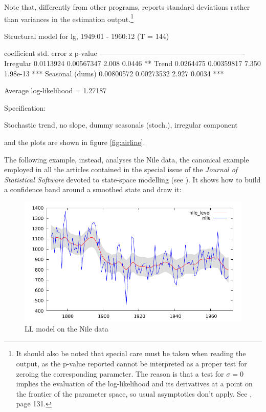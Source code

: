 \documentclass[a4paper,10pt]{article}
\begin{document}
Note that, differently from other programs,  reports
standard deviations rather than variances in the estimation
output.\footnote{It should also be noted that special care must be
  taken when reading the output, as the p-value reported cannot be
  interpreted as a proper test for zeroing the corresponding
  parameter. The reason is that a test for $\sigma = 0$ implies the
  evaluation of the log-likelihood and its derivatives at a point on
  the frontier of the parameter space, so usual asymptotics don't
  apply. See \cite{Pelagatti2015}, page 131.}

\begin{code}
Structural model for lg, 1949:01 - 1960:12 (T = 144)

                    coefficient   std. error     z     p-value 
  -------------------------------------------------------------
  Irregular         0.0113924     0.00567347   2.008   0.0446   **
  Trend             0.0264475     0.00359817   7.350   1.98e-13 ***
  Seasonal (dums)   0.00800572    0.00273532   2.927   0.0034   ***

Average log-likelihood = 1.27187

Specification:

Stochastic trend, no slope, dummy seasonals (stoch.),
irregular component  
\end{code}
and the plots are shown in figure \ref{fig:airline}.

The following example, instead, analyses the Nile data, the canonical
example employed in all the articles contained in the special issue of
the \emph{Journal of Statistical Software} devoted to state-space
modelling (see \cite{JSS2011}). It shows how to build a confidence
band around a smoothed state and draw it:

\begin{figure}[htb]
  \caption{LL model on the Nile data}
  \label{fig:Nile}
  \centering
  \includegraphics[scale=0.71]{nile_example}
\end{figure}
\end{document}
